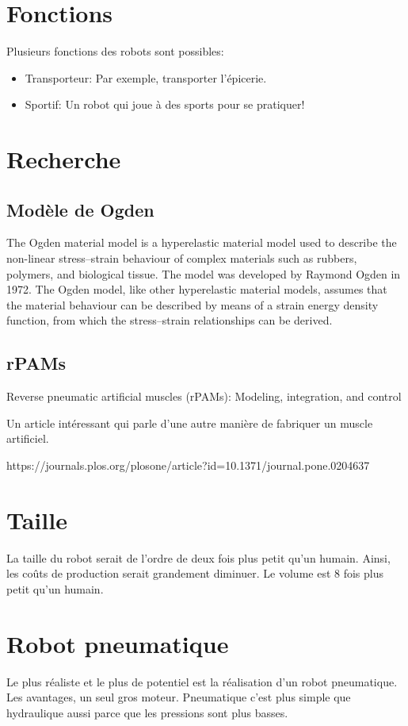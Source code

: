 \documentclass{article}
\begin{document}
\section{Fonctions}

Plusieurs fonctions des robots sont possibles:
\begin{itemize}
    \item Transporteur: Par exemple, transporter l'épicerie.
    \item Sportif: Un robot qui joue à des sports pour se pratiquer!
\end{itemize}


\section{Recherche}

\subsection{Modèle de Ogden}

The Ogden material model is a hyperelastic material model used to describe the non-linear stress–strain behaviour of complex materials such as rubbers, polymers, and biological tissue. The model was developed by Raymond Ogden in 1972. The Ogden model, like other hyperelastic material models, assumes that the material behaviour can be described by means of a strain energy density function, from which the stress–strain relationships can be derived.

\subsection{rPAMs}
Reverse pneumatic artificial muscles (rPAMs): Modeling, integration, and control

Un article intéressant qui parle d'une autre manière de fabriquer un muscle artificiel.

https://journals.plos.org/plosone/article?id=10.1371/journal.pone.0204637

\section{Taille}
La taille du robot serait de l'ordre de deux fois plus petit qu'un humain. Ainsi, les coûts de production serait grandement diminuer. Le volume est 8 fois plus petit qu'un humain.

\section{Robot pneumatique}
Le plus réaliste et le plus de potentiel est la réalisation d'un robot pneumatique. Les avantages, un seul gros moteur. Pneumatique c'est plus simple que hydraulique aussi parce que les pressions sont plus basses.
\end{document}
